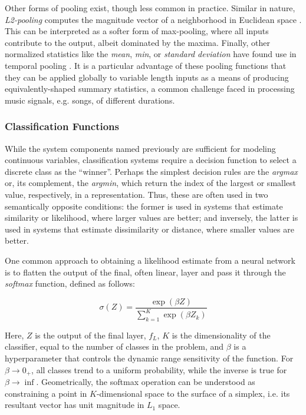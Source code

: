 
Other forms of pooling exist, though less common in practice.
Similar in nature, \emph{L2-pooling} computes the magnitude vector of a neighborhood in Euclidean space \cite{LeCunStudent}.
This can be interpreted as a softer form of max-pooling, where all inputs contribute to the output, albeit dominated by the maxima.
Finally, other normalized statistics like the \emph{mean}, \emph{min}, or \emph{standard deviation} have found use in temporal pooling \cite{Hamel2011}.
It is a particular advantage of these pooling functions that they can be applied globally to variable length inputs as a means of producing equivalently-shaped summary statistics, a common challenge faced in processing music signals, e.g. songs, of different durations.


\subsubsection{Classification Functions}

While the system components named previously are sufficient for modeling continuous variables, classification systems require a decision function to select a discrete class as the ``winner''.
Perhaps the simplest decision rules are the \emph{argmax} or, its complement, the \emph{argmin}, which return the index of the largest or smallest value, respectively, in a representation.
Thus, these are often used in two semantically opposite conditions:
the former is used in systems that estimate similarity or likelihood, where larger values are better;
and inversely, the latter is used in systems that estimate dissimilarity or distance, where smaller values are better.

One common approach to obtaining a likelihood estimate from a neural network is to flatten the output of the final, often linear, layer and pass it through the \emph{softmax} function, defined as follows:

\begin{equation}
\label{eq:softmax}
\sigma(Z) = \frac{\exp(\beta Z)}{ \sum_{k=1}^{K}\exp{(\beta Z_k)}}
\end{equation}

\noindent Here, $Z$ is the output of the final layer, $f_L$, $K$ is the dimensionality of the classifier, equal to the number of classes in the problem, and $\beta$ is a hyperparameter that controls the dynamic range sensitivity of the function.
For $\beta \to 0_+$, all classes trend to a uniform probability, while the inverse is true for $\beta \to \inf$.
Geometrically, the softmax operation can be understood as constraining a point in $K$-dimensional space to the surface of a simplex, i.e. its resultant vector has unit magnitude in $L_1$ space.

